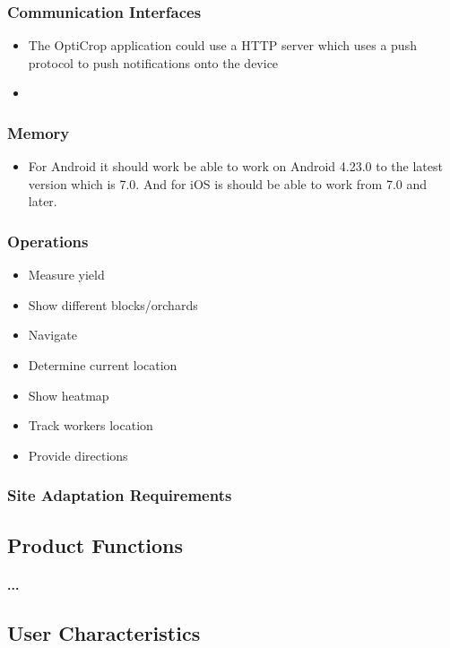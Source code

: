 \documentclass[runningheads,a4paper]{article}
\begin{document}
\subsubsection{Communication Interfaces}
\begin{itemize}
	\item 	The OptiCrop application could use a HTTP server which uses a push protocol to push notifications onto the device
	\item 
	
\end{itemize}
\subsubsection{Memory}
\begin{itemize}
	\item For Android  it should work be able to work on Android 4.23.0 to the latest version which is 7.0. And for iOS is should be able to work from 7.0 and later.
	
\end{itemize}
\subsubsection{Operations}
\begin{itemize}
	\item Measure yield
	\item Show different blocks/orchards
	\item Navigate
	\item	Determine current location
	\item	Show heatmap
	\item	Track workers location
	\item	Provide directions
	
\end{itemize}
\subsubsection{Site Adaptation Requirements}

\subsection{Product Functions}
\paragraph{...}
\subsection{User Characteristics}
\end{document}
